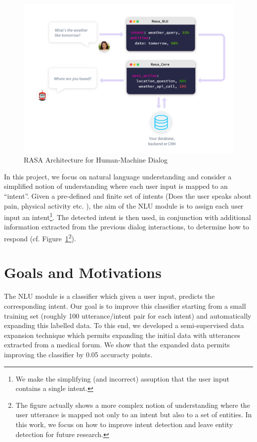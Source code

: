 \documentclass[11pt]{article}
\begin{document}
\begin{figure}[htbp]
\begin{center}
\includegraphics[width=.9\textwidth]{img/rasa.pdf}
\end{center}
\caption{RASA Architecture for Human-Machine Dialog }
\label{fig:rasa}
\end{figure}
In this project, we focus on natural language understanding and
consider a simplified notion of understanding where each user input is
mapped to an ``intent''. Given a pre-defined and finite set of intents
(Does the user speaks about pain, physical activity etc. ), the aim
of the NLU module is to assign each user input an intent\footnote{We
  make the simplifying (and incorrect) assuption that the user input
  contains a single intent.}. The detected intent is then used, in
conjunction with additional information extracted from the previous
dialog interactions, to determine how to
respond (cf. Figure~\ref{fig:rasa}\footnote{The figure
  actually shows a more complex notion of understanding where the user
  utterance is mapped not only to an intent but also to a set of
  entities. In this work, we focus on how to improve intent detection
  and leave entity detection for future research.}).

\section{Goals and Motivations}
\label{sec:goals}


The NLU module is a classifier which given a user input, predicts the
corresponding intent. Our goal is to improve this classifier starting
from a small training set (roughly 100 utterance/intent pair for each
intent) and automatically expanding this labelled data. To this
end, we developed a semi-supervised data expansion technique which
permits expanding the initial data with utterances extracted from a
medical forum. We show that the expanded data permits improving the
classifier by 0.05 accuracty points.
\end{document}
